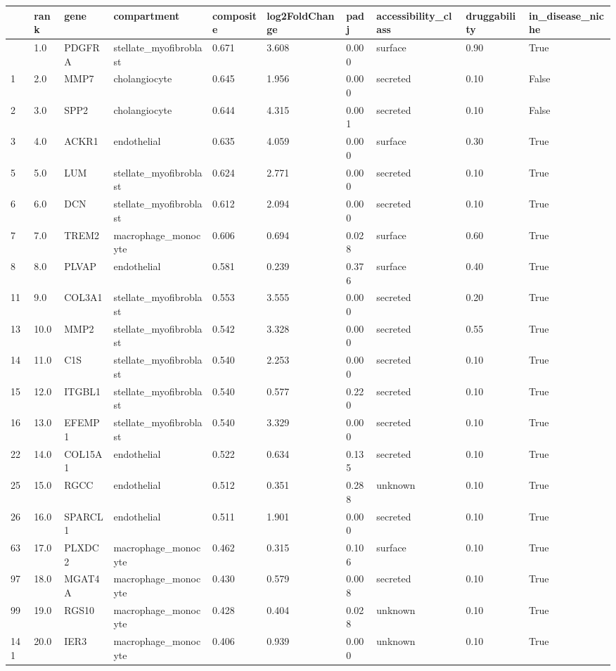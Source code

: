 \documentclass[
  letterpaper,
  DIV=11,
  numbers=noendperiod]{scrartcl}
\newcounter{none} %
\begin{document}
{\def\LTcaptype{none} %
\begin{longtable}[]{@{}llllllllll@{}}
\toprule\noalign{}
& rank & gene & compartment & composite & log2FoldChange & padj &
accessibility\_class & druggability & in\_disease\_niche \\
\midrule\noalign{}
\endhead
\bottomrule\noalign{}
\endlastfoot
0 & 1.0 & PDGFRA & stellate\_myofibroblast & 0.671 & 3.608 & 0.000 &
surface & 0.90 & True \\
1 & 2.0 & MMP7 & cholangiocyte & 0.645 & 1.956 & 0.000 & secreted & 0.10
& False \\
2 & 3.0 & SPP2 & cholangiocyte & 0.644 & 4.315 & 0.001 & secreted & 0.10
& False \\
3 & 4.0 & ACKR1 & endothelial & 0.635 & 4.059 & 0.000 & surface & 0.30 &
True \\
5 & 5.0 & LUM & stellate\_myofibroblast & 0.624 & 2.771 & 0.000 &
secreted & 0.10 & True \\
6 & 6.0 & DCN & stellate\_myofibroblast & 0.612 & 2.094 & 0.000 &
secreted & 0.10 & True \\
7 & 7.0 & TREM2 & macrophage\_monocyte & 0.606 & 0.694 & 0.028 & surface
& 0.60 & True \\
8 & 8.0 & PLVAP & endothelial & 0.581 & 0.239 & 0.376 & surface & 0.40 &
True \\
11 & 9.0 & COL3A1 & stellate\_myofibroblast & 0.553 & 3.555 & 0.000 &
secreted & 0.20 & True \\
13 & 10.0 & MMP2 & stellate\_myofibroblast & 0.542 & 3.328 & 0.000 &
secreted & 0.55 & True \\
14 & 11.0 & C1S & stellate\_myofibroblast & 0.540 & 2.253 & 0.000 &
secreted & 0.10 & True \\
15 & 12.0 & ITGBL1 & stellate\_myofibroblast & 0.540 & 0.577 & 0.220 &
secreted & 0.10 & True \\
16 & 13.0 & EFEMP1 & stellate\_myofibroblast & 0.540 & 3.329 & 0.000 &
secreted & 0.10 & True \\
22 & 14.0 & COL15A1 & endothelial & 0.522 & 0.634 & 0.135 & secreted &
0.10 & True \\
25 & 15.0 & RGCC & endothelial & 0.512 & 0.351 & 0.288 & unknown & 0.10
& True \\
26 & 16.0 & SPARCL1 & endothelial & 0.511 & 1.901 & 0.000 & secreted &
0.10 & True \\
63 & 17.0 & PLXDC2 & macrophage\_monocyte & 0.462 & 0.315 & 0.106 &
surface & 0.10 & True \\
97 & 18.0 & MGAT4A & macrophage\_monocyte & 0.430 & 0.579 & 0.008 &
secreted & 0.10 & True \\
99 & 19.0 & RGS10 & macrophage\_monocyte & 0.428 & 0.404 & 0.028 &
unknown & 0.10 & True \\
141 & 20.0 & IER3 & macrophage\_monocyte & 0.406 & 0.939 & 0.000 &
unknown & 0.10 & True \\
\end{longtable}
}
\end{document}
